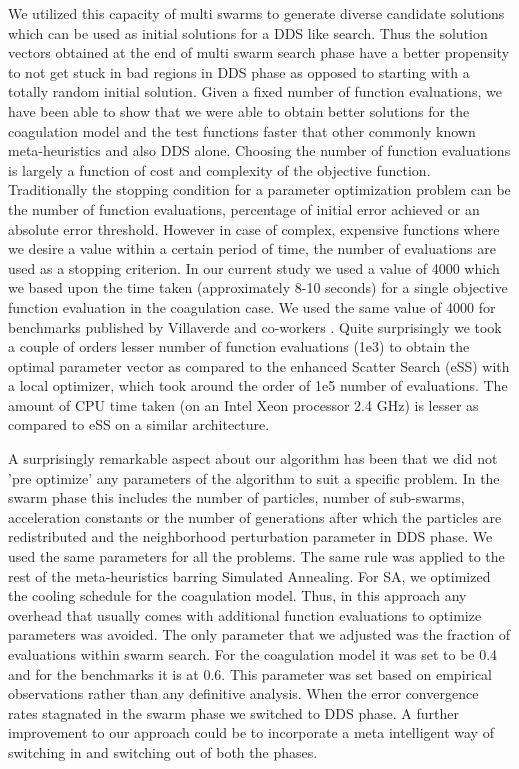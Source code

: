 \documentclass[12pt]{article}
\begin{document}
We utilized this capacity of multi swarms to generate diverse candidate solutions which can be used as initial solutions for a DDS like search. Thus the solution vectors obtained at the end of multi swarm search phase have a better propensity to not get stuck in bad regions in DDS phase as opposed to starting with a totally random initial solution. Given a fixed number of function evaluations, we have been able to show that we were able to obtain better solutions for the coagulation model and the test functions faster that other commonly known meta-heuristics and also DDS alone.  Choosing the number of function evaluations is largely a function of cost and complexity of the objective function. Traditionally the stopping condition for a parameter optimization problem can be the number of function evaluations, percentage of initial error achieved or an absolute error threshold. However in case of complex, expensive functions where we desire a value within a certain period of time, the number of evaluations are used as a stopping criterion. In our current study we used a value of 4000 which we based upon the time taken (approximately 8-10 seconds) for a single objective function evaluation in the coagulation case. We used the same value of 4000 for benchmarks published by Villaverde and co-workers \cite{villaverde2015biopredyn}. Quite surprisingly we took a couple of orders lesser number of function evaluations (1e3) to obtain the optimal parameter vector as compared to the enhanced Scatter Search (eSS) with a local optimizer, which took around the order of 1e5 number of evaluations.  The amount of CPU time taken (on an Intel Xeon processor 2.4 GHz) is lesser as compared to eSS on a similar architecture.

A surprisingly remarkable aspect about our algorithm has been that we did not 'pre optimize' any parameters of the algorithm to suit a specific problem. In the swarm phase this includes the number of particles, number of sub-swarms, acceleration constants or the number of generations after which the particles are redistributed and the neighborhood perturbation parameter in DDS phase. We used the same parameters for all the problems. The same rule was applied to the rest of the meta-heuristics barring Simulated Annealing. For SA, we optimized the cooling schedule for the coagulation model. Thus, in this approach any overhead that usually comes with additional function evaluations to optimize parameters was avoided. The only parameter that we adjusted was the fraction of evaluations within swarm search. For the coagulation model it was set to be 0.4 and for the benchmarks it is at 0.6. This parameter was set based on empirical observations rather than any definitive analysis. When the error convergence rates stagnated in the swarm phase we switched to DDS phase. A further improvement to our approach could  be to incorporate a meta intelligent way of switching in and switching out of both the phases.
\end{document}
